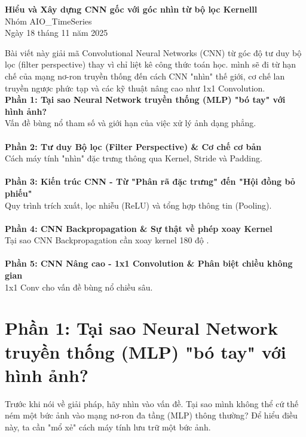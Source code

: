\documentclass[11pt]{article}
\renewcommand{\maketitle}{%
    \begin{center}
        \fontsize{18}{20}\selectfont\textbf{Hiểu và Xây dựng CNN gốc với góc nhìn từ bộ lọc Kernelll}\\[1em]
        \fontsize{14}{16}\selectfont Nhóm AIO\_TimeSeries\\[0.5em]
        \fontsize{14}{16}\selectfont Ngày 18 tháng 11 năm 2025
    \end{center}
    \vspace{1.5em}
}
\begin{document}
\maketitle

\begin{summarybox}
Bài viết này giải mã Convolutional Neural Networks (CNN) từ góc độ tư duy bộ lọc (filter perspective)
thay vì chỉ liệt kê công thức toán học.
mình sẽ đi từ hạn chế của mạng nơ-ron truyền thống đến cách CNN "nhìn" thế giới,
cơ chế lan truyền ngược phức tạp và các kỹ thuật nâng cao như 1x1 Convolution. \\

\textbf{Phần 1: Tại sao Neural Network truyền thống (MLP) "bó tay" với hình ảnh?} \\
Vấn đề bùng nổ tham số và giới hạn của việc xử lý ảnh dạng phẳng. \\ \\
\textbf{Phần 2: Tư duy Bộ lọc (Filter Perspective) \& Cơ chế cơ bản} \\
Cách máy tính "nhìn" đặc trưng thông qua Kernel, Stride và Padding. \\ \\
\textbf{Phần 3: Kiến trúc CNN - Từ "Phân rã đặc trưng" đến "Hội đồng bỏ phiếu"} \\
Quy trình trích xuất, lọc nhiễu (ReLU) và tổng hợp thông tin (Pooling). \\ \\
\textbf{Phần 4: CNN Backpropagation \& Sự thật về phép xoay Kernel} \\
Tại sao CNN Backpropagation cần xoay kernel 180 độ . \\ \\
\textbf{Phần 5: CNN Nâng cao - 1x1 Convolution \& Phân biệt chiều không gian} \\
1x1 Conv cho vấn đề bùng nổ chiều sâu.
\end{summarybox}

\section{Phần 1: Tại sao Neural Network truyền thống (MLP) "bó tay" với hình ảnh?}

Trước khi nói về giải pháp, hãy nhìn vào vấn đề. Tại sao mình không thể cứ thế ném một bức ảnh vào mạng nơ-ron đa tầng (MLP) thông thường? Để hiểu điều này, ta cần "mổ xẻ" cách máy tính lưu trữ một bức ảnh.
\end{document}
